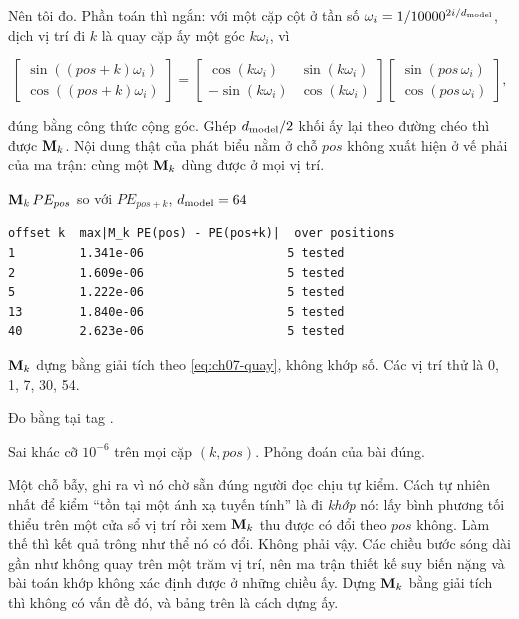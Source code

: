 Nên tôi đo. Phần toán thì ngắn: với một cặp cột ở tần số
\(\omega_i = 1/10000^{2i/d_{\mathrm{model}}}\), dịch vị trí đi \(k\) là quay cặp ấy một góc
\(k\omega_i\), vì

\begin{equation}
  \begin{bmatrix} \sin((pos+k)\omega_i) \\ \cos((pos+k)\omega_i) \end{bmatrix}
  =
  \begin{bmatrix} \cos(k\omega_i) & \sin(k\omega_i) \\
                 -\sin(k\omega_i) & \cos(k\omega_i) \end{bmatrix}
  \begin{bmatrix} \sin(pos\,\omega_i) \\ \cos(pos\,\omega_i) \end{bmatrix},
  \label{eq:ch07-quay}
\end{equation}

đúng bằng công thức cộng góc. Ghép \(d_{\mathrm{model}}/2\) khối ấy lại theo đường chéo thì
được \(\mathbf{M}_k\). Nội dung thật của phát biểu nằm ở chỗ \(pos\) không xuất
hiện ở vế phải của ma trận: cùng một \(\mathbf{M}_k\) dùng được ở mọi vị trí.

\begin{measured}{\(\mathbf{M}_k \, PE_{pos}\) so với \(PE_{pos+k}\), \(d_{\mathrm{model}} = 64\)}
\begin{verbatim}
offset k  max|M_k PE(pos) - PE(pos+k)|  over positions
1         1.341e-06                    5 tested
2         1.609e-06                    5 tested
5         1.222e-06                    5 tested
13        1.840e-06                    5 tested
40        2.623e-06                    5 tested
\end{verbatim}

\(\mathbf{M}_k\) dựng bằng giải tích theo \eqref{eq:ch07-quay}, không khớp số.
Các vị trí thử là 0, 1, 7, 30, 54.

Đo bằng  tại tag .
\end{measured}

Sai khác cỡ \(10^{-6}\) trên mọi cặp \((k, pos)\). Phỏng đoán của bài đúng.

%
Một chỗ bẫy, ghi ra vì nó chờ sẵn đúng người đọc chịu tự kiểm. Cách tự nhiên
nhất để kiểm \enquote{tồn tại một ánh xạ tuyến tính} là đi \emph{khớp} nó: lấy
bình phương tối thiểu trên một cửa sổ vị trí rồi xem \(\mathbf{M}_k\) thu được có
đổi theo \(pos\) không. Làm thế thì kết quả trông như thể nó có đổi. Không phải
vậy. Các chiều bước sóng dài gần như không quay trên một trăm vị trí, nên ma
trận thiết kế suy biến nặng và bài toán khớp không xác định được ở những chiều
ấy. Dựng \(\mathbf{M}_k\) bằng giải tích thì không có vấn đề đó, và bảng trên là
cách dựng ấy.

